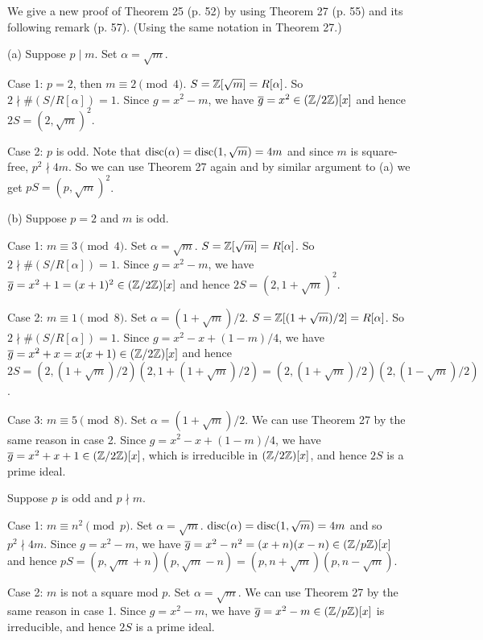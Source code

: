 \documentclass[../Marcus.tex]{subfiles}
\begin{document}
We give a new proof of Theorem 25 (p. 52) by using Theorem 27 (p. 55) and its following remark (p. 57). (Using the same notation in Theorem 27.)

(a) Suppose $p\mid m$. Set $\alpha=\sqrt{m}$. 

Case 1: $p=2$, then $m\equiv 2 \pmod{4}$. $S=\mathbb{Z}[\sqrt{m}]=R[\alpha]$. So $2\nmid \#(S/R[\alpha])=1$. Since $g=x^2-m$, we have $\overline{g}=x^2\in(\mathbb{Z}/2\mathbb{Z})[x]$ and hence $2S=(2,\sqrt{m})^2$.

Case 2: $p$ is odd. Note that $\operatorname{disc}(\alpha)=\operatorname{disc}(1,\sqrt{m})=4m$ and since $m$ is square-free, $p^2\nmid 4m$. So we can use Theorem 27 again and by similar argument to (a) we get $pS=(p,\sqrt{m})^2$.

(b) Suppose $p=2$ and $m$ is odd.

Case 1: $m\equiv3\pmod{4}$. Set $\alpha=\sqrt{m}$. $S=\mathbb{Z}[\sqrt{m}]=R[\alpha]$. So $2\nmid \#(S/R[\alpha])=1$. Since $g=x^2-m$, we have $\overline{g}=x^2+1=(x+1)^2\in(\mathbb{Z}/2\mathbb{Z})[x]$ and hence $2S=(2,1+\sqrt{m})^2$.

Case 2: $m\equiv1\pmod{8}$. Set $\alpha=(1+\sqrt{m})/2$. $S=\mathbb{Z}[(1+\sqrt{m})/2]=R[\alpha]$. So $2\nmid \#(S/R[\alpha])=1$. Since $g=x^2-x+(1-m)/4$, we have $\overline{g}=x^2+x=x(x+1)\in(\mathbb{Z}/2\mathbb{Z})[x]$ and hence $2S=(2,(1+\sqrt{m})/2)(2,1+(1+\sqrt{m})/2)=(2,(1+\sqrt{m})/2)(2,(1-\sqrt{m})/2)$.

Case 3: $m\equiv5\pmod{8}$. Set $\alpha=(1+\sqrt{m})/2$. We can use Theorem 27 by the same reason in case 2. Since $g=x^2-x+(1-m)/4$, we have $\overline{g}=x^2+x+1\in(\mathbb{Z}/2\mathbb{Z})[x]$, which is irreducible in $(\mathbb{Z}/2\mathbb{Z})[x]$, and hence $2S$ is a prime ideal.

Suppose $p$ is odd and $p\nmid m$.

Case 1: $m\equiv n^2\pmod{p}$. Set $\alpha=\sqrt{m}$. $\operatorname{disc}(\alpha)=\operatorname{disc}(1,\sqrt{m})=4m$ and so $p^2\nmid 4m$. Since $g=x^2-m$, we have $\overline{g}=x^2-n^2=(x+n)(x-n)\in(\mathbb{Z}/p\mathbb{Z})[x]$ and hence $pS=(p,\sqrt{m}+n)(p,\sqrt{m}-n)=(p,n+\sqrt{m})(p,n-\sqrt{m})$.

Case 2: $m$ is not a square mod $p$. Set $\alpha=\sqrt{m}$. We can use Theorem 27 by the same reason in case 1. Since $g=x^2-m$, we have $\overline{g}=x^2-m\in(\mathbb{Z}/p\mathbb{Z})[x]$ is irreducible, and hence $2S$ is a prime ideal.
\end{document}
